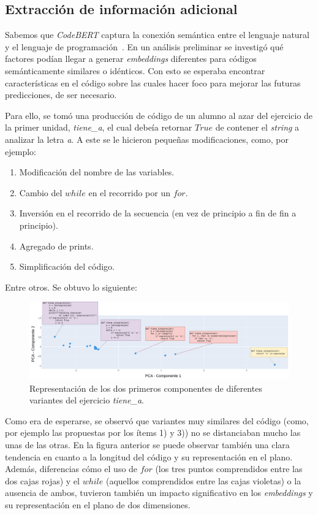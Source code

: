 \documentclass[11pt,a4paper,twoside,openany]{tesis}
\begin{document}
\subsection{Extracción de información adicional}\label{subsec:extraccion}

Sabemos que \emph{CodeBERT} captura la conexión semántica entre el lenguaje natural y el lenguaje de programación~\cite{codeBert}. En un análisis preliminar se investigó qué factores podían llegar a generar \emph{embeddings} diferentes para códigos semánticamente similares o idénticos. Con esto se esperaba encontrar características en el código sobre las cuales hacer foco para mejorar las futuras predicciones, de ser necesario. 

Para ello, se tomó una producción de código de un alumno al azar del ejercicio de la primer unidad, \emph{tiene\_a}, el cual debeía retornar $True$ de contener el \emph{string} a analizar la letra \emph{a}. A este se le hicieron pequeñas modificaciones, como, por ejemplo:
\begin{enumerate}
    \item Modificación del nombre de las variables.
    \item Cambio del $while$ en el recorrido por un $for$.
    \item Inversión en el recorrido de la secuencia (en vez de principio a fin de fin a principio).
    \item Agregado de prints.
    \item Simplificación del código.
\end{enumerate}

Entre otros. Se obtuvo lo siguiente:

\begin{figure}[H]
    \centering
    \includegraphics[width=\textwidth]{imagenes/codigo-similar.png}
    \caption{Representación de los dos primeros componentes de diferentes variantes del ejercicio \emph{tiene\_a}.}
\end{figure}

Como era de esperarse, se observó que variantes muy similares del código (como, por ejemplo las propuestas por los ítems 1) y 3)) no se distanciaban mucho las unas de las otras. En la figura anterior se puede observar también una clara tendencia en cuanto a la longitud del código y su representación en el plano. Además, diferencias cómo el uso de $for$ (los tres puntos comprendidos entre las dos cajas rojas) y el $while$ (aquellos comprendidos entre las cajas violetas) o la ausencia de ambos, tuvieron también un impacto significativo en los \emph{embeddings} y su representación en el plano de dos dimensiones.
\end{document}
